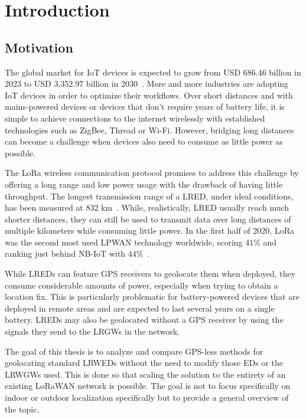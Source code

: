 \chapter{Introduction}

\section{Motivation}

The global market for \ac{IoT} devices is expected to grow from USD 686.46 billion in 2023 to USD 3,352.97 billion in 2030~\cite{statista_industrial_2023}.
More and more industries are adopting \ac{IoT} devices in order to optimize their workflows.
Over short distances and with mains-powered devices or devices that don't require years of battery life, it is simple to achieve connections to the internet wirelessly with established technologies such as ZigBee, Thread or Wi-Fi.
However, bridging long distances can become a challenge when devices also need to consume as little power as possible.

The \ac{LoRa} wireless communication protocol promises to address this challenge by offering a long range and low power usage with the drawback of having little throughput.
The longest transmission range of a \acl{LRED}, under ideal conditions, has been measured at 832 km~\cite{the_things_network_global_team_lora_nodate}.
While, realistically, \acl{LRED} usually reach much shorter distances, they can still be used to transmit data over long distances of multiple kilometers while consuming little power.
In the first half of 2020, \ac{LoRa} was the second most used \ac{LPWAN} technology worldwide, scoring 41\% and ranking just behind NB-IoT with 44\%~\cite{iot_analytics_lpwa_2020}.

While \aclp{LRED} can feature \ac{GPS} receivers to geolocate them when deployed, they consume considerable amounts of power, especially when trying to obtain a location fix.
This is particularly problematic for battery-powered devices that are deployed in remote areas and are expected to last several years on a single battery.
\aclp{LRED} may also be geolocated without a \ac{GPS} receiver by using the signals they send to the \aclp{LRGW} in the network.

The goal of this thesis is to analyze and compare \ac{GPS}-less methods for geolocating standard \aclp{LRWED} without the need to modify those \aclp{ED} or the \aclp{LRWGW} used.
This is done so that scaling the solution to the entirety of an existing \ac{LoRaWAN} network is possible.
The goal is not to focus specifically on indoor or outdoor localization specifically but to provide a general overview of the topic.

